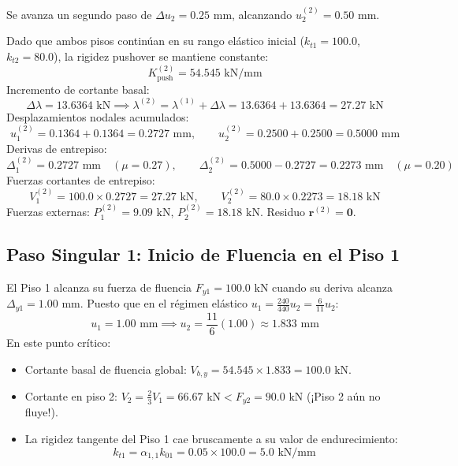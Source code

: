 \documentclass[11pt,letterpaper]{article}
\begin{document}
Se avanza un segundo paso de $\Delta u_2 = 0.25\text{ mm}$, alcanzando $u_2^{(2)} = 0.50\text{ mm}$.

\begin{stepbox}
Dado que ambos pisos continúan en su rango elástico inicial ($k_{t1} = 100.0$, $k_{t2} = 80.0$), la rigidez pushover se mantiene constante:
\begin{equation}
    K_{\text{push}}^{(2)} = 54.545\text{ kN/mm}
\end{equation}
Incremento de cortante basal:
\begin{equation}
    \Delta \lambda = 13.6364\text{ kN} \implies \lambda^{(2)} = \lambda^{(1)} + \Delta \lambda = 13.6364 + 13.6364 = 27.27\text{ kN}
\end{equation}
Desplazamientos nodales acumulados:
\begin{equation}
    u_1^{(2)} = 0.1364 + 0.1364 = 0.2727\text{ mm}, \qquad
    u_2^{(2)} = 0.2500 + 0.2500 = 0.5000\text{ mm}
\end{equation}
Derivas de entrepiso:
\begin{equation}
    \Delta_1^{(2)} = 0.2727\text{ mm} \quad (\mu = 0.27), \qquad
    \Delta_2^{(2)} = 0.5000 - 0.2727 = 0.2273\text{ mm} \quad (\mu = 0.20)
\end{equation}
Fuerzas cortantes de entrepiso:
\begin{equation}
    V_1^{(2)} = 100.0 \times 0.2727 = 27.27\text{ kN}, \qquad
    V_2^{(2)} = 80.0 \times 0.2273 = 18.18\text{ kN}
\end{equation}
Fuerzas externas: $P_1^{(2)} = 9.09\text{ kN}$, $P_2^{(2)} = 18.18\text{ kN}$. Residuo $\mathbf{r}^{(2)} = \mathbf{0}$.
\end{stepbox}

\subsection{Paso Singular 1: Inicio de Fluencia en el Piso 1}

El Piso 1 alcanza su fuerza de fluencia $F_{y1} = 100.0\text{ kN}$ cuando su deriva alcanza $\Delta_{y1} = 1.00\text{ mm}$. Puesto que en el régimen elástico $u_1 = \frac{240}{440} u_2 = \frac{6}{11} u_2$:
\begin{equation}
    u_1 = 1.00\text{ mm} \implies u_2 = \frac{11}{6}(1.00) \approx 1.833\text{ mm}
\end{equation}
En este punto crítico:
\begin{itemize}
    \item Cortante basal de fluencia global: $V_{b,y} = 54.545 \times 1.833 = 100.0\text{ kN}$.
    \item Cortante en piso 2: $V_2 = \frac{2}{3} V_1 = 66.67\text{ kN} < F_{y2} = 90.0\text{ kN}$ (¡Piso 2 aún no fluye!).
    \item La rigidez tangente del Piso 1 cae bruscamente a su valor de endurecimiento:
    \begin{equation}
        k_{t1} = \alpha_{1,1} k_{01} = 0.05 \times 100.0 = 5.0\text{ kN/mm}
    \end{equation}
\end{itemize}
\end{document}
